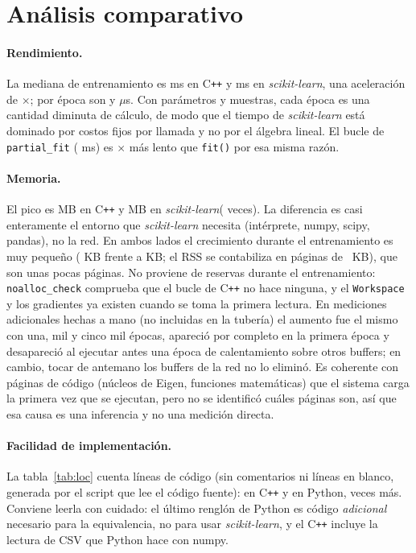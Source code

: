 \documentclass[11pt,a4paper]{article}
\newcommand{\cpp}{C\texttt{++}\xspace}
\newcommand{\sk}{\textit{scikit-learn}\xspace}
\begin{document}
\section{An\'alisis comparativo}
\paragraph{Rendimiento.} La mediana de entrenamiento es \cppMedianMs{} ms en \cpp y \skMedianMs{} ms en \sk, una aceleraci\'on de \speedupMedian{}$\times$; por \'epoca son \cppPerEpochUs{} y \skPerEpochUs{} $\mu$s. Con \nParams{} par\'ametros y \nTrain{} muestras, cada \'epoca es una cantidad diminuta de c\'alculo, de modo que el tiempo de \sk est\'a dominado por costos fijos por llamada y no por el \'algebra lineal. El bucle de \texttt{partial\_fit} (\partialMedianMs{} ms) es \partialOverFit{}$\times$ m\'as lento que \texttt{fit()} por esa misma raz\'on.

\paragraph{Memoria.} El pico es \cppPeakMB{} MB en \cpp y \skPeakMB{} MB en \sk (\memRatio{} veces). La diferencia es casi enteramente el entorno que \sk necesita (int\'erprete, numpy, scipy, pandas), no la red. En ambos lados el crecimiento durante el entrenamiento es muy peque\~no (\cppGrowthKB{} KB frente a \skGrowthKB{} KB; el RSS se contabiliza en p\'aginas de \pageKB~KB), que son unas pocas p\'aginas. No proviene de reservas durante el entrenamiento: \texttt{noalloc\_check} comprueba que el bucle de \cpp no hace ninguna, y el \texttt{Workspace} y los gradientes ya existen cuando se toma la primera lectura. En mediciones adicionales hechas a mano (no incluidas en la tuber\'ia) el aumento fue el mismo con una, mil y cinco mil \'epocas, apareci\'o por completo en la primera \'epoca y desapareci\'o al ejecutar antes una \'epoca de calentamiento sobre otros buffers; en cambio, tocar de antemano los buffers de la red no lo elimin\'o. Es coherente con p\'aginas de c\'odigo (n\'ucleos de Eigen, funciones matem\'aticas) que el sistema carga la primera vez que se ejecutan, pero no se identific\'o cu\'ales p\'aginas son, as\'i que esa causa es una inferencia y no una medici\'on directa.

\paragraph{Facilidad de implementaci\'on.} La tabla~\ref{tab:loc} cuenta l\'ineas de c\'odigo (sin comentarios ni l\'ineas en blanco, generada por el script que lee el c\'odigo fuente): \locCpp{} en \cpp y \locPython{} en Python, \locRatio{} veces m\'as. Conviene leerla con cuidado: el \'ultimo rengl\'on de Python es c\'odigo \emph{adicional} necesario para la equivalencia, no para usar \sk, y el \cpp incluye la lectura de CSV que Python hace con numpy.
\end{document}
